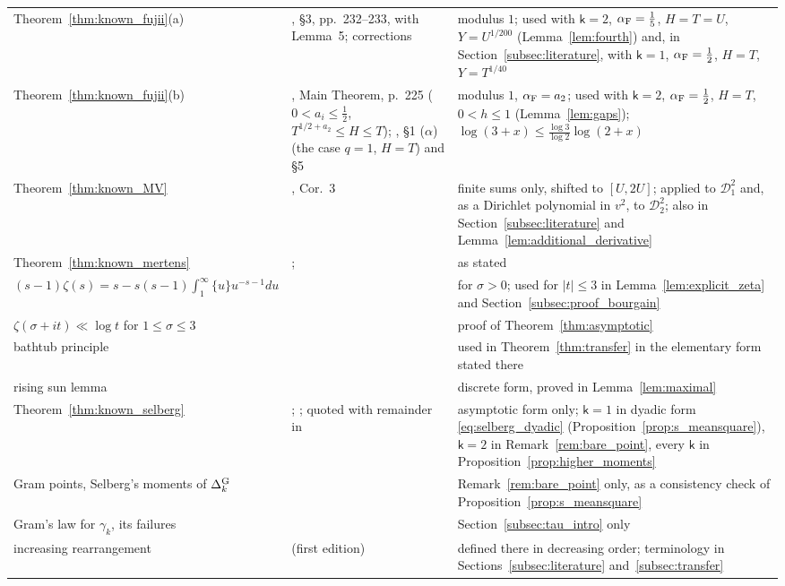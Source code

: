 \documentclass[11pt,a4paper]{article}
\makeatletter
\numberwithin{equation}{section}
\DeclareRobustCommand{\CGref}[1]{\ref{#1}}
\DeclareRobustCommand{\CGeqref}[1]{\eqref{#1}}
\DeclareRobustCommand{\CGcite}[2][]{\if\relax\detokenize{#1}\relax\cite{#2}\else\cite[#1]{#2}\fi}
\let\CG@origref\ref
\let\CG@origeqref\eqref
\newcommand{\CG@gettip}[1]{\@ifundefined{CGTip@#1}{#1}{\csname CGTip@#1\endcsname}}
\newcommand{\CG@getbib}[1]{\@ifundefined{CGBib@#1}{#1}{\csname CGBib@#1\endcsname}}
\DeclareRobustCommand{\CGref}[1]{\pdftooltip{\CG@origref{#1}}{\CG@gettip{#1}}}
\DeclareRobustCommand{\CGeqref}[1]{\pdftooltip{\CG@origeqref{#1}}{\CG@gettip{#1}}}
\DeclareRobustCommand{\CGcite}[2][]{\pdftooltip{\if\relax\detokenize{#1}\relax\cite{#2}\else\cite[#1]{#2}\fi}{\CG@getbib{#2}}}
\theoremstyle{definition}
\theoremstyle{remark}
\makeatother
\begin{document}
\begin{center}
\begin{longtable}{p{}p{}p{}}
Theorem~\CGref{thm:known_fujii}(a) & \CGcite{Fujii1974}, \S3, pp.~232--233, with Lemma~5; corrections \CGcite[\S5]{Fujii1981} & modulus $1$; used with $\mathsf k=2$, $\alpha_{\rm F}=\frac15$, $H=T=U$, $Y=U^{1/200}$ (Lemma~\CGref{lem:fourth}) and, in Section~\CGref{subsec:literature}, with $\mathsf k=1$, $\alpha_{\rm F}=\frac12$, $H=T$, $Y=T^{1/40}$\\
Theorem~\CGref{thm:known_fujii}(b) & \CGcite{Fujii1974}, Main Theorem, p.~225 ($0<a_i\le\frac12$, $T^{1/2+a_2}\le H\le T$); \CGcite{Fujii1981}, \S1 ($\alpha$) (the case $q=1$, $H=T$) and \S5 & modulus $1$, $\alpha_{\rm F}=a_2$; used with $\mathsf k=2$, $\alpha_{\rm F}=\frac12$, $H=T$, $0<h\le1$ (Lemma~\CGref{lem:gaps}); $\log(3+x)\le\frac{\log3}{\log2}\log(2+x)$\\
Theorem~\CGref{thm:known_MV} & \CGcite{MontgomeryVaughan1974}, Cor.~3 & finite sums only, shifted to $[U,2U]$; applied to $\mathscr D_1^2$ and, as a Dirichlet polynomial in $v^2$, to $\mathscr D_2^2$; also in Section~\CGref{subsec:literature} and Lemma~\CGref{lem:additional_derivative}\\
Theorem~\CGref{thm:known_mertens} & \CGcite{Mertens1874}; \CGcite[Ch.~I.1]{Tenenbaum2015} & as stated\\
$(s-1)\zeta(s)=s-s(s-1)\int_1^\infty\{u\}u^{-s-1}du$ & \CGcite[(2.1.4)]{Titchmarsh1986} & for $\sigma>0$; used for $|t|\le3$ in Lemma~\CGref{lem:explicit_zeta} and Section~\CGref{subsec:proof_bourgain}\\
$\zeta(\sigma+it)\ll\log t$ for $1\le\sigma\le3$ & \CGcite[Thm.~3.5]{Titchmarsh1986} & proof of Theorem~\CGref{thm:asymptotic}\\
bathtub principle & \CGcite[Thm.~1.14]{LiebLoss2001} & used in Theorem~\CGref{thm:transfer} in the elementary form stated there\\
rising sun lemma & \CGcite{Riesz1932} & discrete form, proved in Lemma~\CGref{lem:maximal}\\
Theorem~\CGref{thm:known_selberg} & \CGcite{Selberg1946a}; \CGcite[Notes for Chapter~9, (9.25.1), p.~245]{Titchmarsh1986}; quoted with remainder in \CGcite[p.~225]{Fujii1974} & asymptotic form only; $\mathsf k=1$ in dyadic form \CGeqref{eq:selberg_dyadic} (Proposition~\CGref{prop:s_meansquare}), $\mathsf k=2$ in Remark~\CGref{rem:bare_point}, every $\mathsf k$ in Proposition~\CGref{prop:higher_moments}\\
Gram points, Selberg's moments of $\Delta^{\rm G}_k$ & \CGcite[Thm.~4.2]{Korolev2012} & Remark~\CGref{rem:bare_point} only, as a consistency check of Proposition~\CGref{prop:s_meansquare}\\
Gram's law for $\gamma_k$, its failures & \CGcite[Def.~1.4 and p.~58]{Korolev2012} & Section~\CGref{subsec:tau_intro} only\\
increasing rearrangement & \CGcite[\S10.12, pp.~276--278]{HardyLittlewoodPolya1934} (first edition) & defined there in decreasing order; terminology in Sections~\CGref{subsec:literature} and~\CGref{subsec:transfer}\\
\end{longtable}
\end{center}
\end{document}
